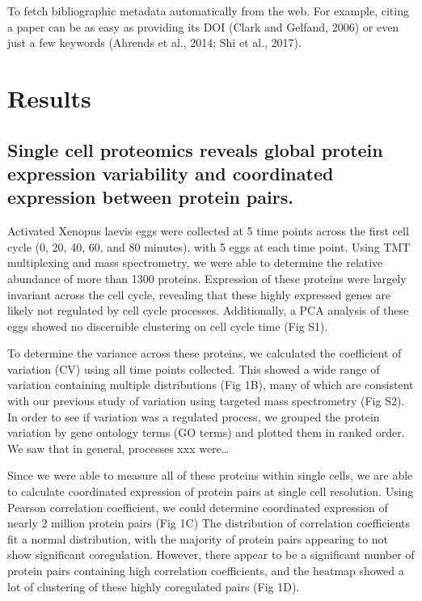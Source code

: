 \documentclass[11pt,twocolumn]{article}
\begin{document}
To fetch bibliographic metadata automatically from the web. For example,
citing a paper can be as easy as providing its DOI (Clark and Gelfand,
2006) or even just a few keywords (Ahrends et al., 2014; Shi et al.,
2017).

\hypertarget{results}{%
\section{Results}\label{results}}

\hypertarget{single-cell-proteomics-reveals-global-protein-expression-variability-and-coordinated-expression-between-protein-pairs.}{%
\subsection{Single cell proteomics reveals global protein expression
variability and coordinated expression between protein
pairs.}\label{single-cell-proteomics-reveals-global-protein-expression-variability-and-coordinated-expression-between-protein-pairs.}}

Activated Xenopus laevis eggs were collected at 5 time points across the
first cell cycle (0, 20, 40, 60, and 80 minutes), with 5 eggs at each
time point. Using TMT multiplexing and mass spectrometry, we were able
to determine the relative abundance of more than 1300 proteins.
Expression of these proteins were largely invariant across the cell
cycle, revealing that these highly expressed genes are likely not
regulated by cell cycle processes. Additionally, a PCA analysis of these
eggs showed no discernible clustering on cell cycle time (Fig S1).

To determine the variance across these proteins, we calculated the
coefficient of variation (CV) using all time points collected. This
showed a wide range of variation containing multiple distributions (Fig
1B), many of which are consistent with our previous study of variation
using targeted mass spectrometry (Fig S2). In order to see if variation
was a regulated process, we grouped the protein variation by gene
ontology terms (GO terms) and plotted them in ranked order. We saw that
in general, processes xxx were\ldots{}

Since we were able to measure all of these proteins within single cells,
we are able to calculate coordinated expression of protein pairs at
single cell resolution. Using Pearson correlation coefficient, we could
determine coordinated expression of nearly 2 million protein pairs (Fig
1C) The distribution of correlation coefficients fit a normal
distribution, with the majority of protein pairs appearing to not show
significant coregulation. However, there appear to be a significant
number of protein pairs containing high correlation coefficients, and
the heatmap showed a lot of clustering of these highly coregulated pairs
(Fig 1D).
\end{document}
